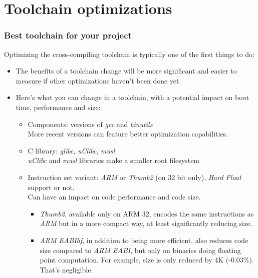 \section{Toolchain optimizations}

\begin{frame}
\frametitle{Best toolchain for your project}
Optimizing the cross-compiling toolchain is typically one of the first
things to do:
\begin{itemize}
  \item The benefits of a toolchain change will be more significant and easier to
        measure if other optimizations haven't been done yet.
  \item Here's what you can change in a toolchain, with a potential
        impact on boot time, performance and size:
  \begin{itemize}
    \item Components: versions of {\em gcc} and {\em binutils}\\
	  More recent versions can feature better optimization capabilities.
    \item C library: {\em glibc}, {\em uClibc}, {\em musl}\\
	  {\em uClibc} and {\em musl} libraries make a smaller root
	  filesystem
    \item Instruction set variant: {\em ARM} or {\em Thumb2} (on 32 bit
          only), {\em Hard Float} support or not.\\
	  Can have an impact on code performance and code size.
          \begin{itemize}
            \item {\em Thumb2}, available only on ARM 32, encodes the same instructions
                  as {\em ARM} but in a more compact way, at least significantly reducing size.
	    \item {\em ARM EABIhf}, in addition to being more efficient,
                  also reduces code size compared to {\em ARM EABI}, but
                  only on binaries doing floating point computation. For
                  example,  size is only reduced by 4K
                  (-0.03\%). That's negligible.
	  \end{itemize}
  \end{itemize}
\end{itemize}
\end{frame}

